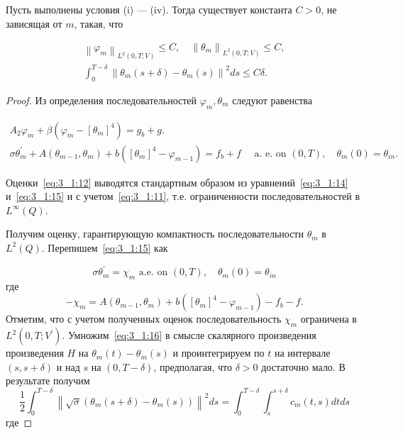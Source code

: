 \begin{lemma}
    \label{lm:3_1:3}
Пусть выполнены условия (i) — (iv).
Тогда существует константа $C > 0$, не зависящая от $m$, такая, что


\begin{gather}
    \left\|\varphi_{m}\right\|_{L^{2}(0, T ; V)} \leq C,
    \quad\left\|\theta_{m}\right\|_{L^{2}(0, T ; V)} \leq C, \label{eq:3_1:12}\\
    \int_{0}^{T-\delta}\left\|\theta_{m}(s+\delta)
    -\theta_{m}(s)\right\|^{2} d s \leq C \delta.\label{eq:3_1:13}
\end{gather}
\end{lemma}

\begin{proof}
Из определения последовательностей $\varphi_{m}, \theta_{m}$ следуют равенства

    \begin{gather}
        A_{2} \varphi_{m}+\beta\left(\varphi_{m}
        -\left[\theta_{m}\right]^{4}\right)=g_{b}+g. \label{eq:3_1:14}\\
        \sigma \theta_{m}^{\prime}+A\left(\theta_{m-1},
        \theta_{m}\right)+b\left(\left[\theta_{m}\right]^{4}-\varphi_{m-1}\right)=f_{b}+f
        \quad \text { a. e. on }(0, T), \quad \theta_{m}(0)=\theta_{i n}.\label{eq:3_1:15}
    \end{gather}


Оценки~\eqref{eq:3_1:12} выводятся стандартным образом
из уравнений~\eqref{eq:3_1:14} и~\eqref{eq:3_1:15}
и с учетом~\eqref{eq:3_1:11}, т.е. ограниченности
последовательностей в $L^{\infty}(Q)$.

Получим оценку, гарантирующую компактность последовательности
$\theta_{m}$ в $L^{2}(Q)$.
Перепишем~\eqref{eq:3_1:15} как

\begin{equation}
    \label{eq:3_1:16}
    \sigma \theta_{m}^{\prime}=\chi_{m}
    \text { a.e. on }(0, T), \quad \theta_{m}(0)=\theta_{i n}
\end{equation}
где
\[
    -\chi_{m}=A\left(\theta_{m-1},
    \theta_{m}\right)+b\left(\left[\theta_{m}\right]^{4}
    -\varphi_{m-1}\right)-f_{b}-f.
\]
Отметим, что с учетом полученных оценок последовательность
$\chi_{m}$ ограничена в $L^{2}\left(0, T ; V^{\prime}\right)$.
Умножим~\eqref{eq:3_1:16} в смысле скалярного произведения произведения
$H$ на $\theta_{m}(t)-\theta_{m}(s)$
и проинтегрируем по $t$ на интервале $(s, s+\delta)$ и
над $s$ на $(0, T-\delta)$, предполагая, что $\delta>0$ достаточно мало.
В результате получим
\[
    \frac{1}{2} \int_{0}^{T-\delta}\left\|\sqrt{\sigma}\left(\theta_{m}(s+\delta)
    - \theta_{m}(s)\right)\right\|^{2} d s
    = \int_{0}^{T-\delta} \int_{s}^{s+\delta} c_{m}(t, s) d t d s
\]
где


\end{proof}
